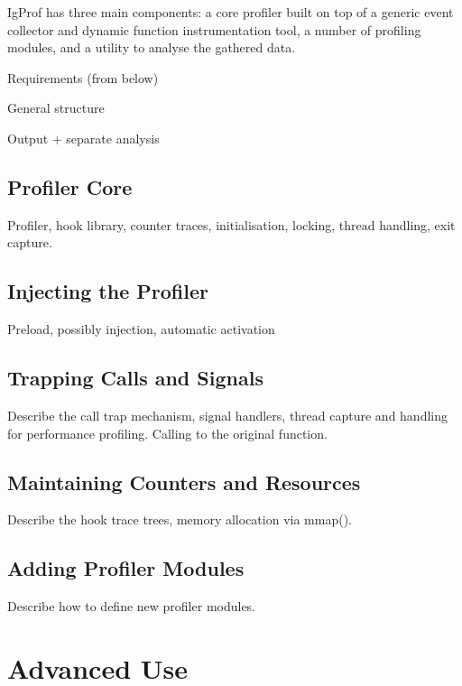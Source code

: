 \documentclass[10pt,a4paper,twocolumn]{article}
\begin{document}
IgProf has three main components: a core profiler built on top of a
generic event collector and dynamic function instrumentation tool, a
number of profiling modules, and a utility to analyse the gathered
data.

Requirements (from below)

General structure

Output + separate analysis


\subsection{Profiler Core}

Profiler, hook library, counter traces, initialisation, locking,
thread handling, exit capture.

\subsection{Injecting the Profiler}

Preload, possibly injection, automatic activation

\subsection{Trapping Calls and Signals}

Describe the call trap mechanism, signal handlers, thread capture and
handling for performance profiling.  Calling to the original function.

\subsection{Maintaining Counters and Resources}

Describe the hook trace trees, memory allocation via mmap().

\subsection{Adding Profiler Modules}

Describe how to define new profiler modules.

\section{Advanced Use}
\end{document}
